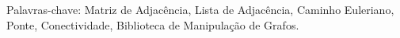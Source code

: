 \begin{resumo}
\vspace{-1cm}

\onehalfspacing

\noindent 


\vspace*{.75cm}

\noindent Palavras-chave: Matriz de Adjacência, Lista de Adjacência, Caminho Euleriano, Ponte, Conectividade, Biblioteca de Manipulação de Grafos.

\end{resumo}